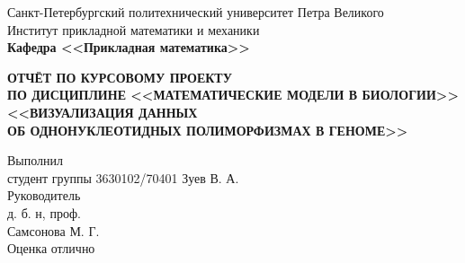 \documentclass[main.tex]{subfiles}
\begin{document}
\begin{titlepage}
\begin{center}
	\begin{large}
		Санкт-Петербургский политехнический университет Петра Великого\\
		Институт прикладной математики и механики\\
		\textbf{Кафедра <<Прикладная математика>>}\\
	\end{large}
	\vfill
	\Large{\textbf{ОТЧЁТ ПО КУРСОВОМУ ПРОЕКТУ\\
            ПО ДИСЦИПЛИНЕ <<МАТЕМАТИЧЕСКИЕ МОДЕЛИ В БИОЛОГИИ>> \\
        	<<ВИЗУАЛИЗАЦИЯ ДАННЫХ \\
        	ОБ ОДНОНУКЛЕОТИДНЫХ ПОЛИМОРФИЗМАХ В ГЕНОМЕ>>}} \normalsize
\end{center}
\vfill
\flushleft
Выполнил\\
студент группы 3630102/70401
\flushright
Зуев В. А.\\
\flushleft
Руководитель\\
\flushright
д. б. н, проф. \\
Самсонова М. Г. \\
\flushleft
Оценка
\flushright
отлично
\flushleft
\vfill
{}
\end{titlepage}
\end{document}
